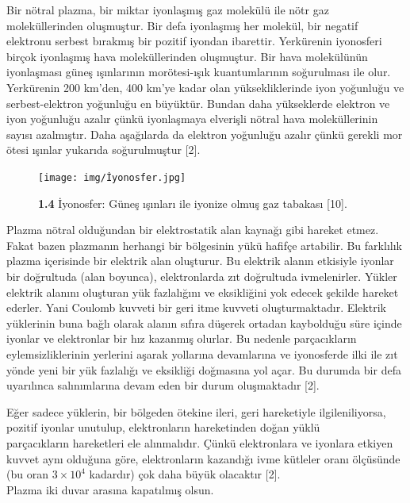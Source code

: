 \documentclass[a4paper,11pt]{article}
\begin{document}
Bir nötral plazma, bir miktar iyonlaşmış gaz molekülü ile nötr gaz \\ moleküllerinden oluşmuştur. Bir defa iyonlaşmış her molekül, bir negatif elektronu serbest bırakmış bir pozitif iyondan ibarettir. Yerkürenin iyonosferi birçok iyonlaşmış hava moleküllerinden oluşmuştur. Bir hava molekülünün iyonlaşması güneş ışınlarının morötesi-ışık kuantumlarının soğurulması ile olur. Yerkürenin 200 km'den, 400 km'ye kadar olan yüksekliklerinde iyon yoğunluğu ve serbest-elektron yoğunluğu en büyüktür. Bundan daha yükseklerde elektron ve iyon yoğunluğu azalır çünkü iyonlaşmaya elverişli nötral hava moleküllerinin sayısı azalmıştır. Daha aşağılarda da elektron yoğunluğu azalır çünkü gerekli mor ötesi ışınlar yukarıda soğurulmuştur [2].

\begin{figure}[h]
	\centering
	\texttt{[image: img/İyonosfer.jpg]}
	\caption* {\textbf{1.4} İyonosfer: Güneş ışınları ile iyonize olmuş gaz tabakası [10].}
\end{figure}

\newpage

Plazma nötral olduğundan bir elektrostatik alan kaynağı gibi hareket etmez. Fakat bazen plazmanın herhangi bir bölgesinin yükü hafifçe artabilir. Bu farklılık plazma içerisinde bir elektrik alan oluşturur. Bu elektrik alanın etkisiyle iyonlar bir doğrultuda (alan boyunca), elektronlarda zıt doğrultuda ivmelenirler. Yükler elektrik alanını oluşturan yük fazlalığını ve eksikliğini yok edecek şekilde hareket ederler. Yani Coulomb kuvveti bir geri itme kuvveti oluşturmaktadır.
Elektrik yüklerinin buna bağlı olarak alanın sıfıra düşerek ortadan kaybolduğu süre içinde iyonlar ve elektronlar bir hız kazanmış olurlar. Bu nedenle parçacıkların eylemsizliklerinin yerlerini aşarak yollarına devamlarına ve iyonosferde ilki ile zıt yönde yeni bir yük fazlalığı ve eksikliği doğmasına yol açar. Bu durumda bir defa uyarılınca salınımlarına devam eden bir durum oluşmaktadır  [2].

Eğer sadece yüklerin, bir bölgeden ötekine ileri, geri hareketiyle ilgileniliyorsa, pozitif iyonlar unutulup, elektronların hareketinden doğan yüklü \\ parçacıkların hareketleri ele alınmalıdır. Çünkü elektronlara ve iyonlara etkiyen kuvvet aynı olduğuna göre, elektronların kazandığı ivme kütleler oranı ölçüsünde (bu oran $ 3 \times 10^{4} $ kadardır) çok daha büyük olacaktır  [2]. \\

Plazma iki duvar arasına kapatılmış olsun. 
\end{document}
